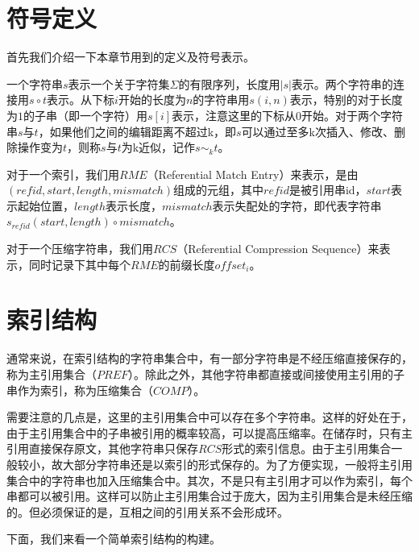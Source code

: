 ﻿\documentclass{sysuthesis}
\begin{document}
\section{符号定义}
首先我们介绍一下本章节用到的定义及符号表示。\par
一个字符串$s$表示一个关于字符集$\Sigma$的有限序列，长度用$|s|$表示。两个字符串的连接用$s \circ t$表示。从下标$i$开始的长度为$n$的字符串用$s(i, n)$表示，特别的对于长度为$1$的子串（即一个字符）用$s[i]$表示，注意这里的下标从0开始。对于两个字符串$s$与$t$，如果他们之间的编辑距离不超过k，即$s$可以通过至多k次插入、修改、删除操作变为$t$，则称$s$与$t$为k近似，记作$s \sim_{k} t$。\par
对于一个索引，我们用$RME$（Referential Match Entry）来表示，是由$(refid, start, length, mismatch)$组成的元组，其中$refid$是被引用串id，$start$表示起始位置，$length$表示长度，$mismatch$表示失配处的字符，即代表字符串$s_{refid}(start, length) \circ mismatch$。\par
对于一个压缩字符串，我们用$RCS$（Referential Compression Sequence）来表示，同时记录下其中每个$RME$的前缀长度$offset_{i}$。



\section{索引结构}
通常来说，在索引结构的字符串集合中，有一部分字符串是不经压缩直接保存的，称为主引用集合（$PREF$）。除此之外，其他字符串都直接或间接使用主引用的子串作为索引，称为压缩集合（$COMP$）。\par
需要注意的几点是，这里的主引用集合中可以存在多个字符串。这样的好处在于，由于主引用集合中的子串被引用的概率较高，可以提高压缩率。在储存时，只有主引用直接保存原文，其他字符串只保存$RCS$形式的索引信息。由于主引用集合一般较小，故大部分字符串还是以索引的形式保存的。为了方便实现，一般将主引用集合中的字符串也加入压缩集合中。其次，不是只有主引用才可以作为索引，每个串都可以被引用。这样可以防止主引用集合过于庞大，因为主引用集合是未经压缩的。但必须保证的是，互相之间的引用关系不会形成环。\par
下面，我们来看一个简单索引结构的构建。
\end{document}
